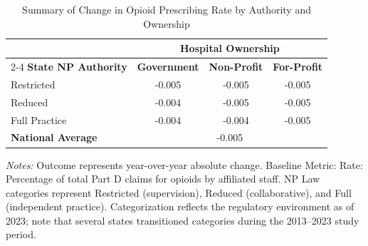 \begin{table}[htbp]
    \centering
    \caption{Summary of Change in Opioid Prescribing Rate by Authority and Ownership}
    \label{tab:d_partd_opioid_rate}
    \vspace{0.2cm}
    \begin{tabular}{lccc}
        \toprule
        & \multicolumn{3}{c}{\textbf{Hospital Ownership}} \\
        \cmidrule(lr){2-4}
        \textbf{State NP Authority} & \textbf{Government} & \textbf{Non-Profit} & \textbf{For-Profit} \\
        \midrule
        Restricted & -0.005 & -0.005 & -0.005 \\
        Reduced & -0.004 & -0.005 & -0.005 \\
        Full Practice & -0.004 & -0.004 & -0.005 \\
        \midrule
        \textbf{National Average} & \multicolumn{3}{c}{-0.005} \\
        \bottomrule
    \end{tabular}
    \vspace{0.1cm}
    \begin{minipage}{0.85\textwidth}
        \footnotesize \textit{Notes:} Outcome represents year-over-year absolute change. Baseline Metric: Rate: Percentage of total Part D claims for opioids by affiliated staff. NP Law categories represent Restricted (supervision), Reduced (collaborative), and Full (independent practice). Categorization reflects the regulatory environment as of 2023; note that several states transitioned categories during the 2013--2023 study period.
    \end{minipage}
\end{table}